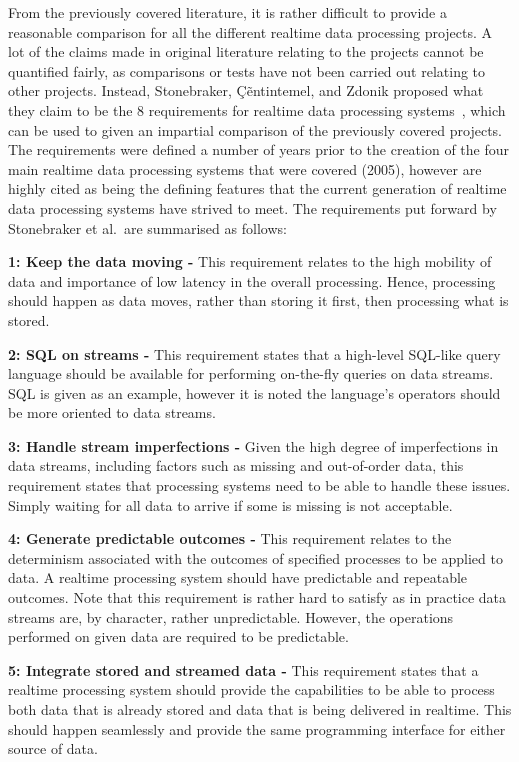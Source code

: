 From the previously covered literature, it is rather difficult to provide a reasonable comparison for all the different
realtime data processing projects. A lot of the claims made in original literature relating to the projects cannot be
quantified fairly, as comparisons or tests have not been carried out relating to other projects. Instead, Stonebraker,
\c{C}\~entintemel, and Zdonik proposed what they claim to be the 8 requirements for realtime data processing systems~\cite{stonebraker_8_2005},
which can be used to given an impartial comparison of the previously covered projects. The requirements were defined a
number of years prior to the creation of the four main realtime data processing systems that were covered (2005), however are highly
cited as being the defining features that the current generation of realtime data processing systems have strived to meet.
The requirements put forward by Stonebraker et al.\ are summarised as follows:

\noindent \textbf{1: Keep the data moving -} This requirement relates to the high mobility of data and importance of low
latency in the overall processing. Hence, processing should happen as data moves, rather than storing it first, then
processing what is stored.

\noindent \textbf{2: SQL on streams -} This requirement states that a high-level SQL-like query language should be
available for performing on-the-fly queries on data streams. SQL is given as an example, however it is noted the language's
operators should be more oriented to data streams.

\noindent \textbf{3: Handle stream imperfections -} Given the high degree of imperfections in data streams, including
factors such as missing and out-of-order data, this requirement states that processing systems need to be able to handle
these issues. Simply waiting for all data to arrive if some is missing is not acceptable.

\noindent \textbf{4: Generate predictable outcomes -} This requirement relates to the determinism associated with the
outcomes of specified processes to be applied to data. A realtime processing system should have predictable and repeatable
outcomes. Note that this requirement is rather hard to satisfy as in practice data streams are, by character, rather
unpredictable. However, the operations performed on given data are required to be predictable.

\noindent \textbf{5: Integrate stored and streamed data -} This requirement states that a realtime processing system
should provide the capabilities to be able to process both data that is already stored and data that is being delivered
in realtime. This should happen seamlessly and provide the same programming interface for either source of data.

